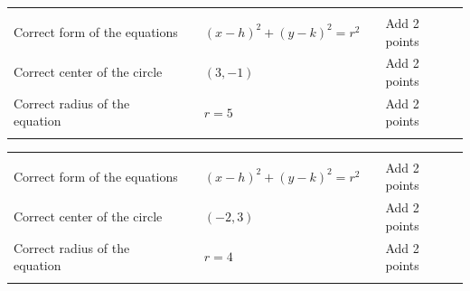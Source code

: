 {\begin{tabular}{lllll}
 &&&&\\ Correct form of the equations&&$(x-h)^2+(y-k)^2=r^2$&&Add 2 points\\
Correct center of the circle&&$(3,-1)$&&Add 2 points\\
Correct radius of the equation&&$r=5$&&Add 2 points\\ &&&&\\ \end{tabular}}




{\begin{tabular}{lllll}
 &&&&\\ Correct form of the equations&&$(x-h)^2+(y-k)^2=r^2$&&Add 2 points\\
Correct center of the circle&&$(-2,3)$&&Add 2 points\\
Correct radius of the equation&&$r=4$&&Add 2 points\\ &&&&\\ \end{tabular}}

